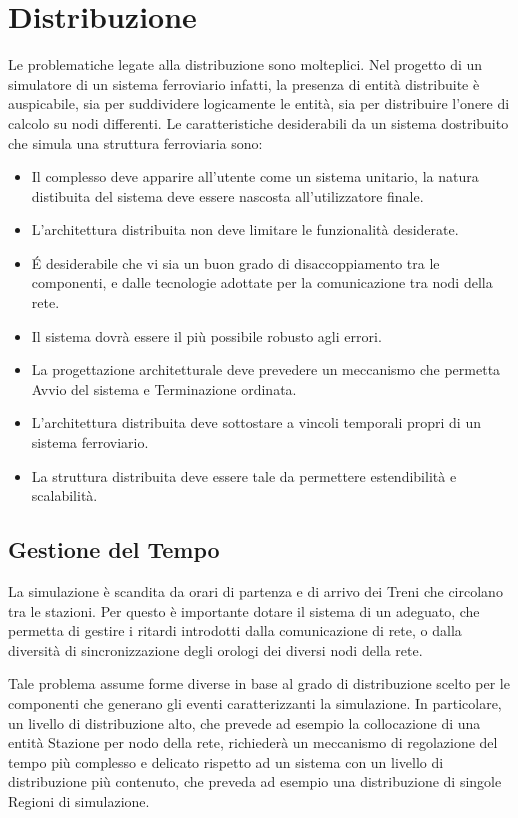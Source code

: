 \section{Distribuzione}

Le problematiche legate alla distribuzione sono molteplici. Nel progetto di un simulatore di un sistema ferroviario infatti, la presenza di entità distribuite è auspicabile, sia per suddividere logicamente le entità, sia per distribuire l'onere di calcolo su nodi differenti.
Le caratteristiche desiderabili da un sistema dostribuito che simula una struttura ferroviaria sono:
	\begin{itemize}
		\item Il complesso deve apparire all'utente come un sistema unitario, la natura distibuita del sistema deve essere nascosta all'utilizzatore finale. 
		\item L'architettura distribuita non deve limitare le funzionalità desiderate.
		\item \'E desiderabile che vi sia un buon grado di disaccoppiamento tra le componenti, e dalle tecnologie adottate per la comunicazione tra nodi della rete.
		\item Il sistema dovrà essere il più possibile robusto agli errori.
		\item La progettazione architetturale deve prevedere un meccanismo che permetta Avvio del sistema e Terminazione ordinata.
		\item L'architettura distribuita deve sottostare a vincoli temporali propri di un sistema ferroviario.
		\item La struttura distribuita deve essere tale da permettere estendibilità e scalabilità.
	\end{itemize}

	\subsection{Gestione del Tempo}
	
	La simulazione è scandita da orari di partenza e di arrivo dei Treni che circolano tra le stazioni. Per questo è importante dotare il sistema di un  adeguato, che permetta di gestire i ritardi introdotti dalla comunicazione di rete, o dalla diversità di sincronizzazione degli orologi dei diversi nodi della rete.
	 
	Tale problema assume forme diverse in base al grado di distribuzione scelto per le componenti che generano gli eventi caratterizzanti la simulazione. In particolare, un livello di distribuzione alto, che prevede ad esempio la collocazione di una entità Stazione per nodo della rete, richiederà un meccanismo di regolazione del tempo più complesso e delicato rispetto ad un sistema con un livello di distribuzione più contenuto, che preveda ad esempio una distribuzione di singole Regioni di simulazione. 
	
